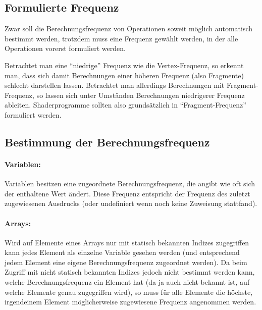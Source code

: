 \subsection{Formulierte Frequenz}
\label{formulierte_frequenz}

Zwar soll die Berechnungsfrequenz von Operationen soweit möglich automatisch bestimmt werden, trotzdem muss eine Frequenz
gewählt werden, in der alle Operationen vorerst formuliert werden.

Betrachtet man eine "`niedrige"' Frequenz wie die Vertex-Frequenz, so erkennt man, dass sich damit Berechnungen einer höheren
Frequenz (also Fragmente) schlecht darstellen lassen. Betrachtet man allerdings Berechnungen mit Fragment-Frequenz, so lassen sich
unter Umständen Berechnungen niedrigerer Frequenz ableiten.
Shaderprogramme sollten also grundsätzlich in "`Fragment-Frequenz"' formuliert werden.

\subsection{Bestimmung der Berechnungsfrequenz}

\paragraph{Variablen:} Variablen besitzen eine zugeordnete Berechnungsfrequenz, die angibt wie oft sich der enthaltene Wert ändert.
Diese Frequenz entspricht der Frequenz des zuletzt zugewiesenen Ausdrucks (oder undefiniert wenn noch keine Zuweisung stattfand).

\paragraph{Arrays:} %
Wird auf Elemente eines Arrays nur mit statisch bekannten Indizes zugegriffen kann jedes Element als einzelne Variable gesehen werden
(und entsprechend jedem Element eine eigene Berechnungsfrequenz zugeordnet werden).
Da beim Zugriff mit nicht statisch bekannten Indizes jedoch nicht bestimmt werden kann, welche Berechnungsfrequenz ein
Element hat (da ja auch nicht bekannt ist, auf welche Elemente genau zugegriffen wird), so muss für alle Elemente die höchste, irgendeinem Element möglicherweise
zugewiesene Frequenz angenommen werden.

